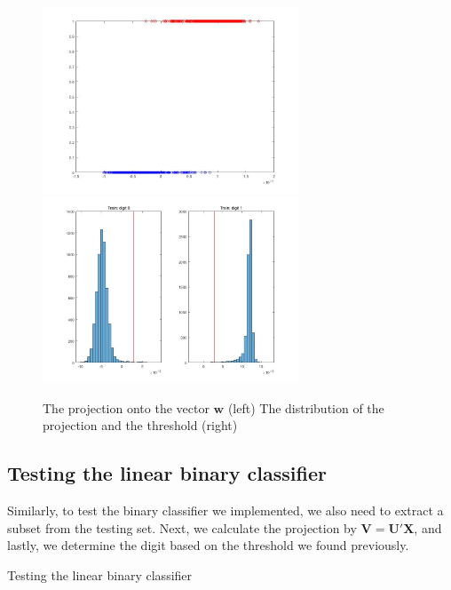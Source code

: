 \documentclass{article}
\begin{document}
\begin{figure}[h]
    \centerline{\includegraphics[width=3in]{LDA1.jpg}\includegraphics[width=3in]{LDA2.jpg}}
    \caption{The projection onto the vector $\mathbf{w}$ (left) The distribution of the projection and the threshold (right)}
\end{figure}
\subsection{Testing the linear binary classifier}
Similarly, to test the binary classifier we implemented, we also need to extract a subset from the testing set. Next, we calculate the projection by $\mathbf{V=U'X}$, and lastly, we determine the digit based on the threshold we found previously.
\begin{algorithm}
\begin{algorithmic}
\end{algorithmic}
\caption{Testing the linear binary classifier}
\end{algorithm}
\end{document}

